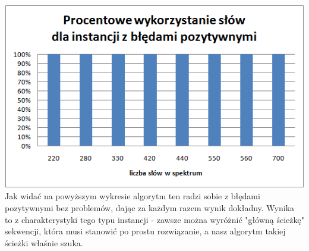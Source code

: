\documentclass[a4paper]{article}
\begin{document}
\includegraphics{percentageUsedWords_general_positive.png}
Jak widać na powyższym wykresie algorytm ten radzi sobie z błędami pozytywnymi bez problemów, dając za każdym razem wynik dokładny. Wynika to z charakterystyki tego typu instancji - zawsze można wyróżnić "główną ścieżkę" sekwencji, która musi stanowić po prostu rozwiązanie, a nasz algorytm takiej ścieżki właśnie szuka.
\end{document}
